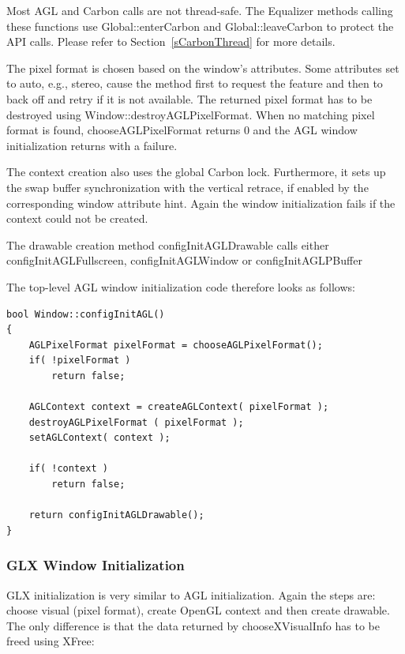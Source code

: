 \documentclass[10pt,a4]{scrartcl}
\newcommand{\sref}[1]{Section~\ref{#1}}
\begin{document}
Most AGL and Carbon calls are not thread-safe. The Equalizer methods
calling these functions use \textsf{Global::enterCarbon} and
\textsf{Global::leaveCarbon} to protect the API calls. Please refer to
\sref{sCarbonThread} for more details.

The pixel format is chosen based on the window's attributes. Some
attributes set to auto, e.g., stereo, cause the method first to request
the feature and then to back off and retry if it is not available. The
returned pixel format has to be destroyed using
\textsf{Window::destroyAGLPixelFormat}. When no matching pixel format is
found, \textsf{chooseAGLPixelFormat} returns \textsf{0} and the AGL
window initialization returns with a failure.

The context creation also uses the global Carbon lock. Furthermore, it
sets up the swap buffer synchronization with the vertical retrace, if
enabled by the corresponding window attribute hint. Again the window
initialization fails if the context could not be created.

The drawable creation method \textsf{configInitAGLDrawable} calls either
\textsf{configInitAGLFullscreen}, \textsf{configInitAGLWindow} or \textsf{configInitAGLPBuffer}

The top-level AGL window initialization code therefore looks as follows:

{\footnotesize\begin{lstlisting}
bool Window::configInitAGL()
{
    AGLPixelFormat pixelFormat = chooseAGLPixelFormat();
    if( !pixelFormat )
        return false;

    AGLContext context = createAGLContext( pixelFormat );
    destroyAGLPixelFormat ( pixelFormat );
    setAGLContext( context );

    if( !context )
        return false;

    return configInitAGLDrawable();
}
\end{lstlisting}}


\subsubsection{GLX Window Initialization}

GLX initialization is very similar to AGL initialization. Again the
steps are: choose visual (pixel format), create OpenGL context and then
create drawable. The only difference is that the data returned by
\textsf{chooseXVisualInfo} has to be freed using \textsf{XFree}:
\end{document}

